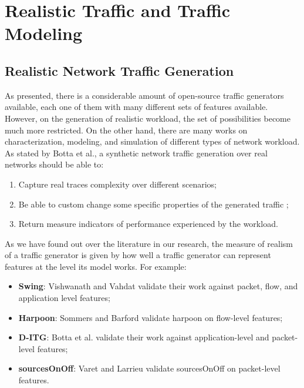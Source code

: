 \section{Realistic Traffic and Traffic Modeling}\label{sec:modeling-traffic}

\subsection{Realistic Network Traffic Generation}

As presented, there is a considerable amount of open-source traffic generators available, each one of them with many different sets of features available. However, on the generation of realistic workload, the set of possibilities become much more restricted. On the other hand, there are many works on characterization, modeling, and simulation of different types of network workload. As stated by Botta et al., a synthetic network traffic generation over real networks should be able to: 

\begin{enumerate}
\item Capture real traces complexity over different scenarios;
\item Be able to custom change some specific properties of the generated traffic ;
\item Return measure indicators of performance experienced by the workload.
\end{enumerate}


As we have found out over the literature in our research, the measure of realism of a traffic generator is given by how well a traffic generator can represent features at the level its model works. For example:

\begin{itemize}
\item \textbf{Swing}: Vishwanath and Vahdat\cite{swing-paper} validate their work against packet, flow, and application level features;
\item \textbf{Harpoon}: Sommers and Barford\cite{harpoon-validation} validate harpoon on flow-level features;
\item \textbf{D-ITG}: Botta et al.\cite{ditg-paper} validate their work against application-level and packet-level features;
\item \textbf{sourcesOnOff}: Varet and Larrieu validate sourcesOnOff on packet-level features\cite{sourcesonoff-paper}. 
\end{itemize}


